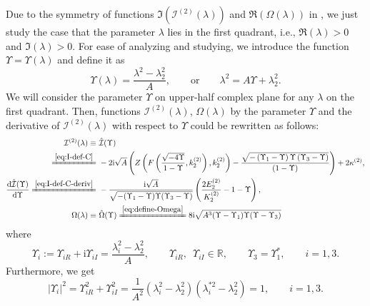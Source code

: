 \documentclass[11pt,reqno]{amsart}
\newcommand{\ii}{\mathrm{i}}
\newcommand{\dd}{\mathrm{d}}
\numberwithin{equation}{section}
\begin{document}
Due to the symmetry of functions $\Im(\mathcal{I}^{(2)}(\lambda))$ and $\Re(\Omega(\lambda))$ in , we just study the case that the parameter $\lambda$ lies in the first quadrant, i.e., $\Re(\lambda)> 0$ and $\Im(\lambda)> 0$. 
For ease of analyzing and studying, we introduce the function $\Upsilon=\Upsilon(\lambda)$ and define it as
\begin{equation}\label{eq:Lambda}
	\Upsilon(\lambda)
	=\frac{\lambda^2-\lambda_2^2}{A}, 
	\qquad  \text{or} \qquad 
	\lambda^2=A\Upsilon +\lambda_2^2.
\end{equation}
We will consider the parameter $\Upsilon$ on upper-half complex plane for any $\lambda$ on the first quadrant.
Then, functions $\mathcal{I}^{(2)}(\lambda)$, $\Omega(\lambda)$ by the parameter $\Upsilon$  and the derivative of $\mathcal{I}^{(2)}(\lambda)$  with respect to $\Upsilon$ could be rewritten as follows:
\begin{equation}\label{eq:I-Lambda-C}
	\begin{split}
		\mathcal{I}^{(2)}(\lambda)\equiv &\  \hat{\mathcal{I}}
		 (\Upsilon)\\ 
		 \xlongequal{\eqref{eq:I-def-C}} &\  -2\ii \sqrt{A}\left(Z\left(F\left(\frac{\sqrt{-4\Upsilon }}{1-\Upsilon },  k^{(2)}_2\right),  k^{(2)}_2\right)-\frac{\sqrt{-\left(\Upsilon_1-\Upsilon \right)\Upsilon \left(\Upsilon_3-\Upsilon \right)}}{\left(1-\Upsilon\right)}\right)+ 2\kappa^{(2)},\\
		\frac{\dd  \hat{\mathcal{I}} (\Upsilon)}{\dd \Upsilon}\xlongequal{\eqref{eq:I-def-C-deriv}} &\  -\frac{\ii\sqrt{A} }{\sqrt{-(\Upsilon_1-\Upsilon)\Upsilon(\Upsilon_3-\Upsilon)}}\left(\frac{2 E^{(2)}_2}{  K^{(2)}_2}-1-\Upsilon\right),\\
		\Omega(\lambda)  \equiv  &\  \hat{\Omega}(\Upsilon) \xlongequal{\eqref{eq:define-Omega}} 8 \ii \sqrt{A^3(\Upsilon-\Upsilon_1)\Upsilon(\Upsilon-\Upsilon_3)}
	\end{split}
\end{equation}
where 
\begin{equation}\nonumber
	\Upsilon_i:=\Upsilon_{iR}+\ii \Upsilon_{iI}=\frac{\lambda_i^2-\lambda_2^2}{A}, \qquad 
	\Upsilon_{iR},\,\,\, \Upsilon_{iI}\in \mathbb{R}, \qquad 
	\Upsilon_3=\Upsilon_1^*,\qquad
	i=1,3.
\end{equation}
Furthermore, we get 
\begin{equation}\label{eq:Lambda-i-1}
	|\Upsilon_i|^2=\Upsilon_{iR}^2+\Upsilon_{iI}^2=\frac{1}{A^2}\left(\lambda_i^2-\lambda_2^2\right)\left(\lambda_i^{*2}-\lambda_2^2\right)=1, \qquad i=1,3.
\end{equation}
\end{document}
